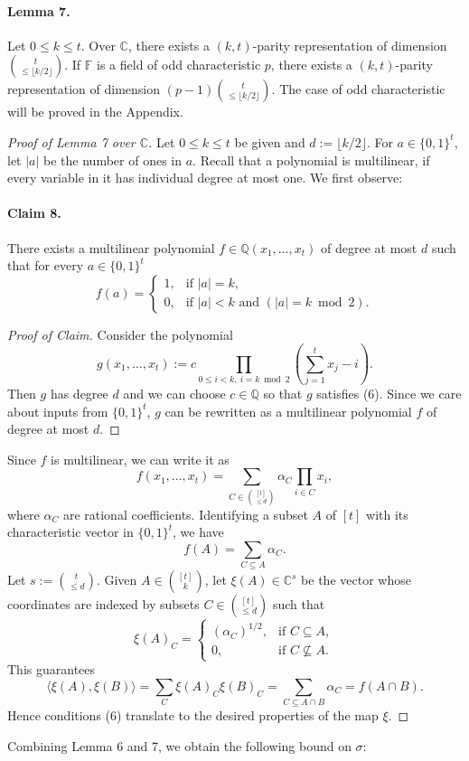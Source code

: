 \documentclass[10pt,a4paper]{article}
\begin{document}
\paragraph{Lemma 7.} Let $0\le k\le t$. Over $\mathbb C$, there exists a $(k,t)$-parity representation of dimension $\binom t{\le\lfloor k/2\rfloor}$. If $\mathbb F$ is a field of odd characteristic $p$, there exists a $(k,t)$-parity representation of dimension $(p-1)\binom t{\le\lfloor k/2\rfloor}$.
The case of odd characteristic will be proved in the Appendix.
\begin{proof}[Proof of Lemma 7 over $\mathbb C$]
Let $0\le k\le t$ be given and $d:=\lfloor k/2\rfloor$.
For $a\in\{0,1\}^t$, let $|a|$ be the number of ones in $a$. Recall that a polynomial is multilinear, if every variable in it has individual degree at most one. We first observe:
\paragraph{Claim 8.} There exists a multilinear polynomial $f\in\mathbb Q(x_1,\ldots,x_t)$ of degree at most $d$ such that for every $a\in\{0,1\}^t$
\begin{equation}
f(a)=\begin{cases}1,&\text{if }|a|=k,\\0,&\text{if }|a|<k\text{ and }(|a|=k\bmod2).\end{cases}\tag{6}
\end{equation}
\begin{proof}[Proof of Claim]
Consider the polynomial
\[g(x_1,\ldots,x_t):=c\prod_{0\le i<k,\ i=k\bmod2}\left(\sum_{j=1}^t x_j-i\right).\]
Then $g$ has degree $d$ and we can choose $c\in\mathbb Q$ so that $g$ satisfies (6). Since we care about inputs from $\{0,1\}^t$, $g$ can be rewritten as a multilinear polynomial $f$ of degree at most $d$.
\end{proof}
Since $f$ is multilinear, we can write it as
\[f(x_1,\ldots,x_t)=\sum_{C\in\binom{[t]}{\le d}}\alpha_C\prod_{i\in C}x_i,\]
where $\alpha_C$ are rational coefficients. Identifying a subset $A$ of $[t]$ with its characteristic vector in $\{0,1\}^t$, we have
\[f(A)=\sum_{C\subseteq A}\alpha_C.\]
Let $s:=\binom t{\le d}$. Given $A\in\binom{[t]}k$, let $\xi(A)\in\mathbb C^s$ be the vector whose coordinates are indexed by subsets $C\in\binom{[t]}{\le d}$ such that
\[\xi(A)_C=\begin{cases}(\alpha_C)^{1/2},&\text{if }C\subseteq A,\\0,&\text{if }C\not\subseteq A.\end{cases}\]
This guarantees
\[\langle\xi(A),\xi(B)\rangle=\sum_C\xi(A)_C\xi(B)_C=\sum_{C\subseteq A\cap B}\alpha_C=f(A\cap B).\]
Hence conditions (6) translate to the desired properties of the map $\xi$.
\end{proof}
Combining Lemma 6 and 7, we obtain the following bound on $\sigma$:
\end{document}
